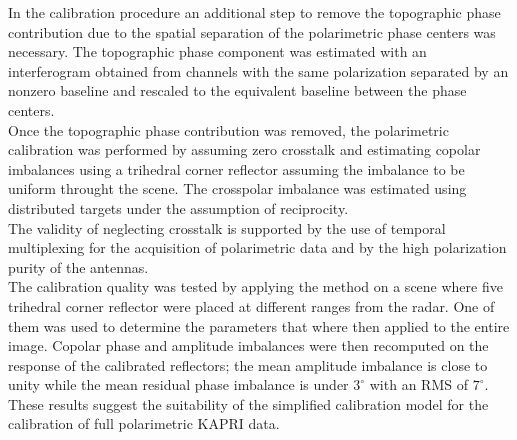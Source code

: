 In the calibration procedure an additional step to remove the topographic phase contribution due to the spatial separation of the polarimetric phase centers was necessary. The topographic phase component was estimated with an interferogram obtained from channels with the same polarization separated by an nonzero baseline and rescaled to the equivalent baseline between the phase centers.\\ Once the topographic phase contribution was removed, the polarimetric calibration was performed by assuming zero crosstalk and estimating copolar imbalances using a trihedral corner reflector assuming the imbalance to be uniform throught the scene. The crosspolar imbalance was estimated using distributed targets under the assumption of reciprocity.\\ The validity of neglecting crosstalk is supported by the use of temporal multiplexing for the acquisition of polarimetric data and by the high polarization purity of the antennas.\\ The calibration quality was tested by applying the method on a scene where five trihedral corner reflector were placed at different ranges from the radar. One of them was used to determine the parameters that where then applied to the entire image. Copolar phase and amplitude imbalances were then recomputed on the response of the calibrated reflectors; the mean amplitude imbalance is close to unity while the mean residual phase imbalance is under $3^\circ$ with an RMS of $7^\circ$. These results suggest the suitability of the simplified calibration model for the calibration of full polarimetric KAPRI data.